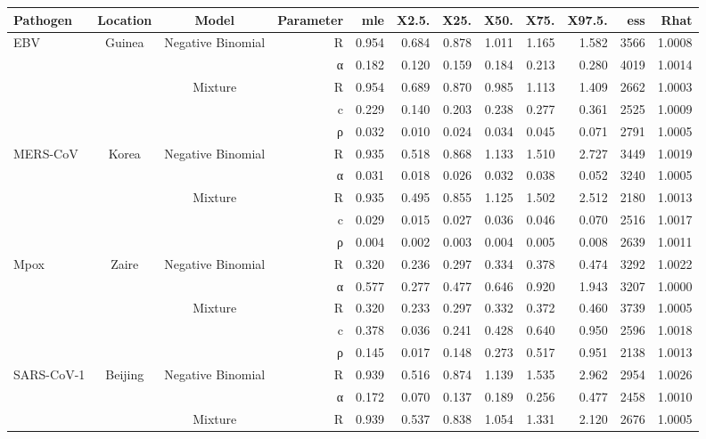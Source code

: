\begin{table}[ht]
\centering
\begin{tabular}{lccrrrrrrrrr}
  \hline
Pathogen & Location & Model & Parameter & mle & X2.5. & X25. & X50. & X75. & X97.5. & ess & Rhat \\ 
  \hline
EBV & Guinea & Negative Binomial & R & 0.954 & 0.684 & 0.878 & 1.011 & 1.165 & 1.582 & 3566 & 1.0008 \\ 
   &  &  & α & 0.182 & 0.120 & 0.159 & 0.184 & 0.213 & 0.280 & 4019 & 1.0014 \\ 
   &  & Mixture & R & 0.954 & 0.689 & 0.870 & 0.985 & 1.113 & 1.409 & 2662 & 1.0003 \\ 
   &  &  & c & 0.229 & 0.140 & 0.203 & 0.238 & 0.277 & 0.361 & 2525 & 1.0009 \\ 
   &  &  & ρ & 0.032 & 0.010 & 0.024 & 0.034 & 0.045 & 0.071 & 2791 & 1.0005 \\ 
  MERS-CoV & Korea & Negative Binomial & R & 0.935 & 0.518 & 0.868 & 1.133 & 1.510 & 2.727 & 3449 & 1.0019 \\ 
   &  &  & α & 0.031 & 0.018 & 0.026 & 0.032 & 0.038 & 0.052 & 3240 & 1.0005 \\ 
   &  & Mixture & R & 0.935 & 0.495 & 0.855 & 1.125 & 1.502 & 2.512 & 2180 & 1.0013 \\ 
   &  &  & c & 0.029 & 0.015 & 0.027 & 0.036 & 0.046 & 0.070 & 2516 & 1.0017 \\ 
   &  &  & ρ & 0.004 & 0.002 & 0.003 & 0.004 & 0.005 & 0.008 & 2639 & 1.0011 \\ 
  Mpox & Zaire & Negative Binomial & R & 0.320 & 0.236 & 0.297 & 0.334 & 0.378 & 0.474 & 3292 & 1.0022 \\ 
   &  &  & α & 0.577 & 0.277 & 0.477 & 0.646 & 0.920 & 1.943 & 3207 & 1.0000 \\ 
   &  & Mixture & R & 0.320 & 0.233 & 0.297 & 0.332 & 0.372 & 0.460 & 3739 & 1.0005 \\ 
   &  &  & c & 0.378 & 0.036 & 0.241 & 0.428 & 0.640 & 0.950 & 2596 & 1.0018 \\ 
   &  &  & ρ & 0.145 & 0.017 & 0.148 & 0.273 & 0.517 & 0.951 & 2138 & 1.0013 \\ 
  SARS-CoV-1 & Beijing & Negative Binomial & R & 0.939 & 0.516 & 0.874 & 1.139 & 1.535 & 2.962 & 2954 & 1.0026 \\ 
   &  &  & α & 0.172 & 0.070 & 0.137 & 0.189 & 0.256 & 0.477 & 2458 & 1.0010 \\ 
   &  & Mixture & R & 0.939 & 0.537 & 0.838 & 1.054 & 1.331 & 2.120 & 2676 & 1.0005 \\ 

\end{tabular}
\end{table}
